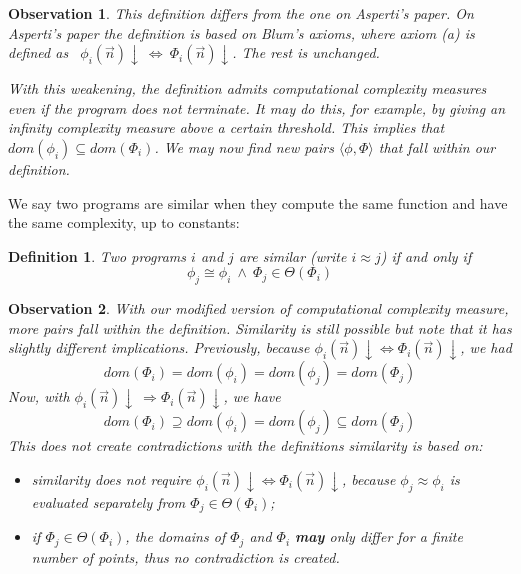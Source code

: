 \documentclass[10pt, a4paper, oneside, titlepage, draft]{article}
\newtheorem{definition}[shrd]{Definition}
\newtheorem{observation}{Observation}[shrd]
\begin{document}
\begin{observation}
    This definition differs from the one on Asperti's paper. On Asperti's paper the definition is based on Blum's axioms, where axiom (a) is defined as \ $\phi_i(\vec{n})\downarrow \ \iff \ \Phi_i(\vec{n}) \downarrow$. The rest is unchanged.

    With this \textit{weakening}, the definition admits computational complexity measures even if the program does not terminate. It may do this, for example, by giving an infinity complexity measure above a certain threshold. This implies that $dom(\phi_i) \subseteq dom(\Phi_i)$. We may now find new pairs $\langle \phi, \Phi \rangle$ that fall within our definition.
\end{observation}

We say two programs are similar when they compute the same function and have the same complexity, up to constants:

\begin{definition}
    Two programs $i$ and $j$ are similar (write $i \approx j$) if and only if
    \begin{equation*}
        \phi_j \cong \phi_i \ \wedge \ \Phi_j \in \Theta(\Phi_i)
    \end{equation*}
\end{definition}

\begin{observation}
    With our modified version of computational complexity measure, more pairs fall within the definition. Similarity is still possible but note that it has slightly different implications. 
    Previously, because $\phi_i(\vec{n})\downarrow \iff \Phi_i(\vec{n})\downarrow$, we had
    \begin{equation*}
        dom(\Phi_i) = dom(\phi_i) = dom(\phi_j) = dom(\Phi_j)
    \end{equation*}
    Now, with $\phi_i(\vec{n}) \downarrow \ \Rightarrow \Phi_i(\vec{n})\downarrow$, we have
    \begin{equation*}
        dom(\Phi_i) \supseteq dom(\phi_i) = dom(\phi_j) \subseteq dom(\Phi_j)
    \end{equation*}
    This does not create contradictions with the definitions similarity is based on:
    \begin{itemize}
        \item similarity does not require $\phi_i(\vec{n})\downarrow \iff \Phi_i(\vec{n})\downarrow$, because $\phi_j \approx \phi_i$ is evaluated separately from $ \Phi_j \in \Theta(\Phi_i)$;
        \item if $\Phi_j \in \Theta(\Phi_i)$, the domains of $\Phi_j$ and $\Phi_i$ \textbf{may} only differ for a finite number of points, thus no contradiction is created. 
    \end{itemize}
\end{observation}
\end{document}
